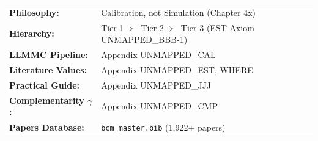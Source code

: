 
\begin{abstract}
This appendix serves as the \textbf{single entry point} for understanding how to parameterize any EBF model component. Parameterization methodology is distributed across 10+ appendices and 6+ chapters - this reference consolidates the complete landscape into one navigable map. \textbf{Core principle:} EBF uses \textit{calibration on experimental evidence}, not simulation. Three tiers exist: (1) Hard Empirical, (2) Meta-Analytical, (3) Synthetic/LLMMC. This appendix answers: "I need a parameter value - where do I start and what method applies?"
\end{abstract}


\begin{tcolorbox}[colback=blue!5!white, colframe=blue!75!black, title=Quick Reference: Parameter Methodology]
\small
\begin{tabular}{ll}
\textbf{Philosophy:} & Calibration, not Simulation (Chapter 4x) \\
\textbf{Hierarchy:} & Tier 1 $\succ$ Tier 2 $\succ$ Tier 3 (EST Axiom UNMAPPED_BBB-1) \\
\textbf{LLMMC Pipeline:} & Appendix UNMAPPED_CAL \\
\textbf{Literature Values:} & Appendix UNMAPPED_EST, WHERE \\
\textbf{Practical Guide:} & Appendix UNMAPPED_JJJ \\
\textbf{Complementarity $\gamma$:} & Appendix UNMAPPED_CMP \\
\textbf{Papers Database:} & \texttt{bcm\_master.bib} (1,922+ papers) \\
\end{tabular}
\end{tcolorbox}


